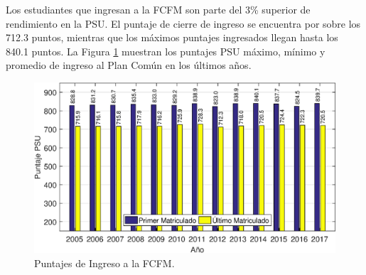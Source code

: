 

Los estudiantes que
ingresan a la FCFM son parte del 3\% superior de rendimiento en la PSU. El puntaje de cierre de
ingreso se encuentra por sobre los 712.3 puntos, mientras que los máximos puntajes ingresados llegan
hasta los 840.1 puntos. La Figura \ref{puntajes_psu} muestran los puntajes PSU máximo, mínimo y promedio de
ingreso al Plan Común en los últimos años.

\begin{figure}[ht!]
\centering
\includegraphics[width=\columnwidth]{./pictures/puntajes_psu.eps}
\caption{Puntajes de Ingreso a la FCFM.}
\label{puntajes_psu}
\end{figure}

